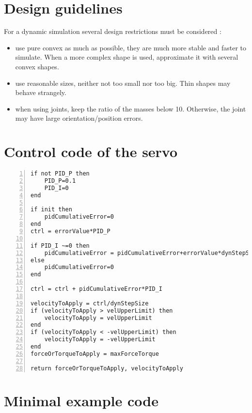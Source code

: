 \chapter{Design guidelines}
For a dynamic simulation several design restrictions must be considered : \begin{itemize}
\item use pure convex as much as possible, they are much more stable and faster to simulate. When a more complex shape is used, approximate it with several convex shapes.

\item use reasonable sizes, neither not too small nor too big. Thin shapes may behave strangely.

\item when using joints, keep the ratio of the masses below 10. Otherwise, the joint may have large orientation/position errors.
\end{itemize}

\chapter{Control code of the servo}
\begin{lstlisting}[language={[5.0]Lua}, numbers = left, tabsize = 4, frame=single,breaklines, keywordstyle=\color{blue}, label={lst:servo}, captionpos = b]
if not PID_P then
    PID_P=0.1
    PID_I=0
end

if init then
    pidCumulativeError=0
end
ctrl = errorValue*PID_P

if PID_I ~=0 then
    pidCumulativeError = pidCumulativeError+errorValue*dynStepSize
else
    pidCumulativeError=0
end

ctrl = ctrl + pidCumulativeError*PID_I

velocityToApply = ctrl/dynStepSize
if (velocityToApply > velUpperLimit) then
    velocityToApply = velUpperLimit
end
if (velocityToApply < -velUpperLimit) then
    velocityToApply = -velUpperLimit
end
forceOrTorqueToApply = maxForceTorque

return forceOrTorqueToApply, velocityToApply
\end{lstlisting}

\chapter{Minimal example code}
